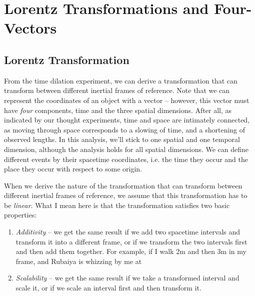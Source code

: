 \section{Lorentz Transformations and Four-Vectors}
\subsection{Lorentz Transformation}
From the time dilation experiment, we can derive a transformation that can transform between different inertial frames of reference. Note that we can represent the coordinates of an object with a vector -- however, this vector must have \textit{four} components, time and the three spatial dimensions. After all, as indicated by our thought experiments, time and space are intimately connected, as moving through space corresponds to a slowing of time, and a shortening of observed lengths. In this analysis, we'll stick to one spatial and one temporal dimension, although the analysis holds for all spatial dimensions. We can define different events by their spacetime coordinates, i.e. the time they occur and the place they occur with respect to some origin. 

When we derive the nature of the transformation that can transform between different inertial frames of reference, we assume that this transformation has to be \textit{linear}. What I mean here is that the transformation satisfies two basic properties: 
\begin{enumerate} %
    \item \textit{Additivity} -- we get the same result if we add two spacetime intervals and transform it into a different frame, or if we transform the two intervals first and then add them together. For example, if I walk 2m and then 3m in my frame, and Rubaiya is whizzing by me at %
    \item \textit{Scalability} -- we get the same result if we take a transformed interval and scale it, or if we scale an interval first and then transform it. 
\end{enumerate}

